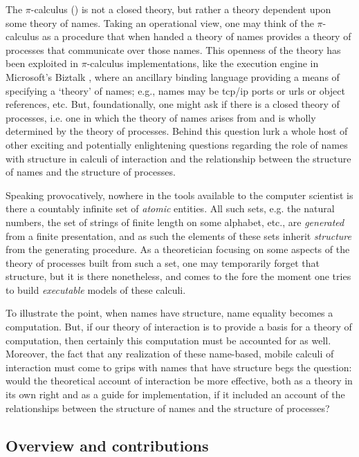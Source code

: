 \documentclass[]{entcs}
\newcommand{\pic}{$\pi$-calculus}
\begin{document}
The {\pic} (\cite{milner91polyadicpi}) is not a closed theory, but
rather a theory dependent upon some theory of names. Taking an
operational view, one may think of the {\pic} as a procedure that when
handed a theory of names provides a theory of processes that
communicate over those names. This openness of the theory has been
exploited in {\pic} implementations, like the execution engine in
Microsoft's Biztalk \cite{biztalk}, where an ancillary binding
language providing a means of specifying a `theory' of names; e.g.,
names may be tcp/ip ports or urls or object references, etc. But,
foundationally, one might ask if there is a closed theory of
processes, i.e. one in which the theory of names arises from and is
wholly determined by the theory of processes. Behind this question
lurk a whole host of other exciting and potentially enlightening
questions regarding the role of names with structure in calculi of
interaction and the relationship between the structure of names and
the structure of processes.

Speaking provocatively, nowhere in the tools available to the computer
scientist is there a countably infinite set of \textit{atomic}
entities. All such sets, e.g. the natural numbers, the set of strings
of finite length on some alphabet, etc., are \textit{generated} from a
finite presentation, and as such the elements of these sets inherit
\textit{structure} from the generating procedure. As a theoretician
focusing on some aspects of the theory of processes built from such a
set, one may temporarily forget that structure, but it is there
nonetheless, and comes to the fore the moment one tries to build
\textit{executable} models of these calculi. 

To illustrate the point, when names have structure, name equality
becomes a computation. But, if our theory of interaction is to provide
a basis for a theory of computation, then certainly this computation
must be accounted for as well. Moreover, the fact that any realization
of these name-based, mobile calculi of interaction must come to grips
with names that have structure begs the question: would the
theoretical account of interaction be more effective, both as a theory
in its own right and as a guide for implementation, if it included an
account of the relationships between the structure of names and the
structure of processes?

\subsection{Overview and contributions} 
\end{document}
